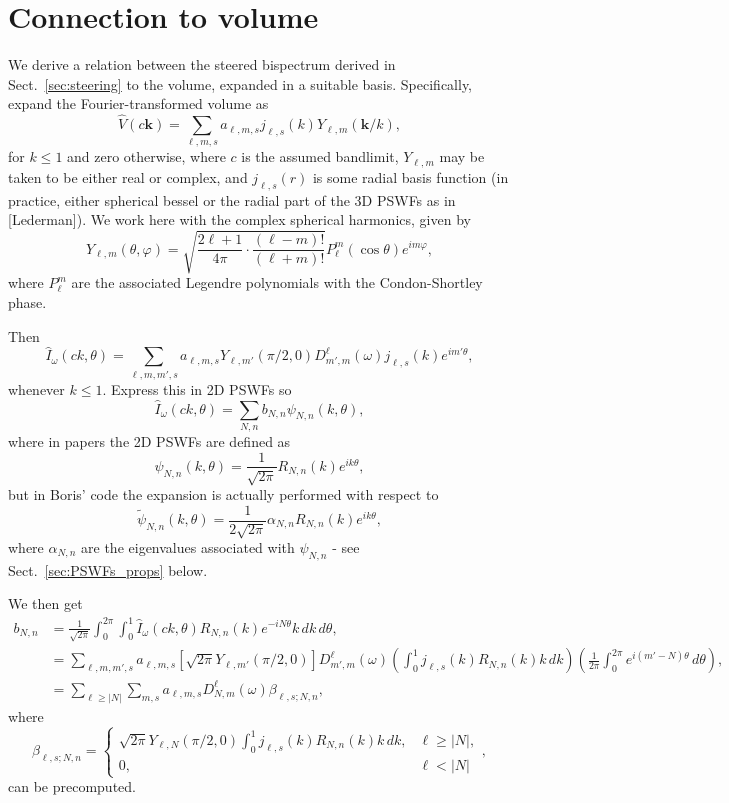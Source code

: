 \documentclass[english,11pt]{article}
\newcommand{\1}{\mathbf{1}}
\newcommand{\kk}{\textbf{k}}
\numberwithin{equation}{section}
\theoremstyle{plain}
\theoremstyle{definition}
\theoremstyle{remark}
\theoremstyle{plain}
\theoremstyle{remark}
\theoremstyle{plain}
\theoremstyle{plain}
\begin{document}
\section{Connection to volume}

We derive a relation between the steered bispectrum derived in Sect.~\ref{sec:steering} to the volume, expanded in a suitable basis. Specifically, expand the Fourier-transformed volume as
\[ \widehat V(c\kk) = \sum_{\ell,m,s}a_{\ell,m,s}j_{\ell,s}(k)Y_{\ell,m}(\kk/k),\]
for $k\leq 1$ and zero otherwise, where $c$ is the assumed bandlimit, $Y_{\ell,m}$ may be taken to be either real or complex, and $j_{\ell,s}(r)$ is some radial basis function (in practice, either spherical bessel or the radial part of the 3D PSWFs as in [Lederman]). We work here with the complex spherical harmonics, given by
\[ Y_{\ell,m}(\theta,\varphi) = \sqrt{\frac{2\ell+1}{4\pi}\cdot\frac{(\ell-m)!}{(\ell+m)!}}P_{\ell}^m(\cos\theta)e^{i m\varphi},\]
where $P_{\ell}^m$ are the associated Legendre polynomials with the Condon-Shortley phase. 

Then
\[ \widehat I_{\omega}(ck,\theta) = \sum_{\ell,m,m',s}a_{\ell,m,s}Y_{\ell,m'}(\pi/2,0)D_{m',m}^{\ell}(\omega)j_{\ell,s}(k)e^{im'\theta},\]
whenever $k\leq 1$. Express this in 2D PSWFs so
\[ \widehat I_{\omega}(ck,\theta) = \sum_{N,n}b_{N,n}\psi_{N,n}(k,\theta),\]
where in papers the 2D PSWFs are defined as
\[ \psi_{N,n}(k,\theta) = \frac{1}{\sqrt{2\pi}}R_{N,n}(k)e^{ik\theta},\]
but in Boris' code the expansion is actually performed with respect to
\[ \widetilde\psi_{N,n}(k,\theta) = \frac{1}{2\sqrt{2\pi}}\alpha_{N,n}R_{N,n}(k)e^{ik\theta},\]
where $\alpha_{N,n}$ are the eigenvalues associated with $\psi_{N,n}$ - see Sect.~\ref{sec:PSWFs_props} below. 

We then get
\[\begin{aligned} b_{N,n} &= \frac{1}{\sqrt{2\pi}}\int_0^{2\pi}\int_0^1\widehat I_{\omega}(ck,\theta)R_{N,n}(k)e^{-iN\theta}k\, dk\, d\theta,\\
&= \sum_{\ell,m,m',s}a_{\ell,m,s}[\sqrt{2\pi}Y_{\ell,m'}(\pi/2,0)]D_{m',m}^{\ell}(\omega)\left(\int_0^1j_{\ell,s}(k)R_{N,n}(k)k\, dk\right)\left(\frac{1}{2\pi}\int_0^{2\pi}e^{i(m'-N)\theta}\, d\theta\right),\\
&= \sum_{\ell\geq |N|}\sum_{m,s}a_{\ell,m,s}D_{N,m}^{\ell}(\omega)\beta_{\ell,s;N,n},\end{aligned}\]
where
\[ \beta_{\ell,s;N,n} = \left\{\begin{array}{ll} \sqrt{2\pi}Y_{\ell,N}(\pi/2,0)\int_0^1j_{\ell,s}(k)R_{N,n}(k)k\, dk, & \ell\geq |N|,\\ 0, & \ell<|N|\end{array}\right.,\]
can be precomputed.
\end{document}
